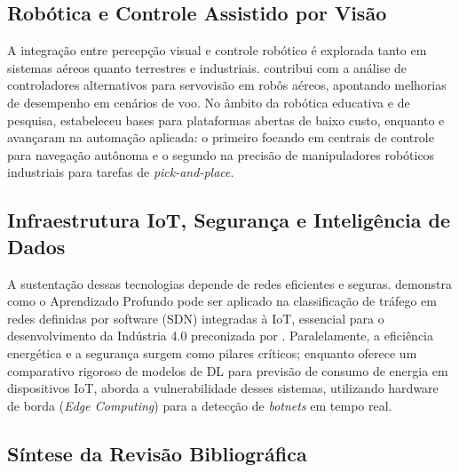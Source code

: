 \subsection*{Robótica e Controle Assistido por Visão}

A integração entre percepção visual e controle robótico é explorada tanto em sistemas aéreos quanto terrestres e industriais.  contribui com a análise de controladores alternativos para servovisão em robôs aéreos, apontando melhorias de desempenho em cenários de voo. No âmbito da robótica educativa e de pesquisa,  estabeleceu bases para plataformas abertas de baixo custo, enquanto  e  avançaram na automação aplicada: o primeiro focando em centrais de controle para navegação autônoma e o segundo na precisão de manipuladores robóticos industriais para tarefas de \textit{pick-and-place}.

\subsection*{Infraestrutura IoT, Segurança e Inteligência de Dados}

A sustentação dessas tecnologias depende de redes eficientes e seguras.  demonstra como o Aprendizado Profundo pode ser aplicado na classificação de tráfego em redes definidas por software (SDN) integradas à IoT, essencial para o desenvolvimento da Indústria 4.0 preconizada por . Paralelamente, a eficiência energética e a segurança surgem como pilares críticos; enquanto  oferece um comparativo rigoroso de modelos de DL para previsão de consumo de energia em dispositivos IoT,  aborda a vulnerabilidade desses sistemas, utilizando hardware de borda (\textit{Edge Computing}) para a detecção de \textit{botnets} em tempo real.

\subsection*{Síntese da Revisão Bibliográfica}

